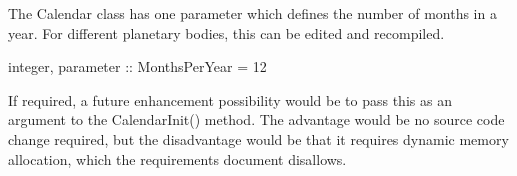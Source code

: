 
The Calendar class has one parameter which defines the number of months
in a year.  For different planetary bodies, this can be edited and
recompiled.

        integer, parameter :: MonthsPerYear = 12

If required, a future enhancement possibility would be to pass this as an
argument to the CalendarInit() method.  The advantage would be no source
code change required, but the disadvantage would be that it requires
dynamic memory allocation, which the requirements document disallows.
